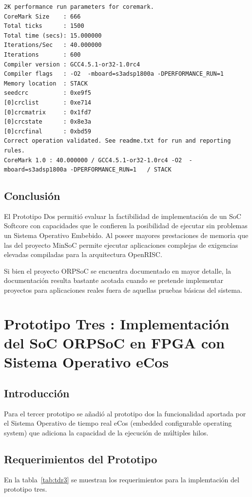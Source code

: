 \newpage

\begin{lstlisting}[frame=single,caption={Salida de la terminal serie de los resultados de la ejecución del benchmark},label={lst:rescrm},breaklines]
2K performance run parameters for coremark.
CoreMark Size    : 666
Total ticks      : 1500
Total time (secs): 15.000000
Iterations/Sec   : 40.000000
Iterations       : 600
Compiler version : GCC4.5.1-or32-1.0rc4
Compiler flags   : -O2  -mboard=s3adsp1800a -DPERFORMANCE_RUN=1  
Memory location  : STACK
seedcrc          : 0xe9f5
[0]crclist       : 0xe714
[0]crcmatrix     : 0x1fd7
[0]crcstate      : 0x8e3a
[0]crcfinal      : 0xbd59
Correct operation validated. See readme.txt for run and reporting rules.
CoreMark 1.0 : 40.000000 / GCC4.5.1-or32-1.0rc4 -O2  -mboard=s3adsp1800a -DPERFORMANCE_RUN=1   / STACK
\end{lstlisting}

		\section{Conclusión}
		El Prototipo Dos permitió evaluar la factibilidad de implementación de un SoC Softcore con capacidades que le confieren la posibilidad de ejecutar
		sin problemas un Sistema Operativo Embebido. Al poseer mayores prestaciones de memoria que las del proyecto MinSoC permite ejecutar aplicaciones
		complejas de exigencias elevadas compiladas para la arquitectura OpenRISC. 
		 
		Si bien el proyecto ORPSoC se encuentra documentado en mayor detalle, la documentación resulta bastante acotada cuando se pretende implementar
		proyectos para aplicaciones reales fuera de aquellas pruebas básicas del sistema. 		


\newpage
\chapter{Prototipo Tres : Implementación del SoC ORPSoC en FPGA con Sistema Operativo eCos}
		\section{Introducción}

		Para el tercer prototipo se añadió al prototipo dos la funcionalidad aportada por el Sistema Operativo de tiempo real eCos (embedded configurable operating system) que adiciona la capacidad de la ejecución de múltiples hilos. 

		\section{Requerimientos del Prototipo}
En la tabla~\ref{tab:tdr3} se muestran los requerimientos para la implemtación del prototipo tres.		

